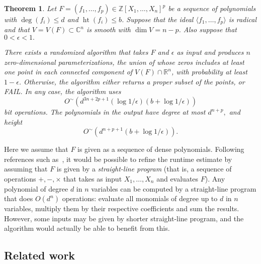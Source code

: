 \documentclass[a4paper]{article}
\DeclareMathOperator{\htt}{ht}
\newcommand{\ZZ}{{\mathbb{Z}}}
\def\C{\mathbb{C}}
\def\R{\mathbb{R}}
\newtheorem{theorem}{Theorem}[section]
\begin{document}
%
%
\begin{theorem}\label{theo:main}
  Let $F= (f_1,\hdots,f_p)\in\ZZ[X_1,\hdots,X_n]^p$ be a sequence of polynomials with $\deg(f_i) \leq d$ and $\htt(f_i) \leq b$. Suppose that the ideal $\langle f_1,\hdots, f_p \rangle $ is radical and that $V=V(F) \subset \C^n$ is 
  smooth with $\dim V = n-p$. Also suppose that $0 < \epsilon < 1.$

  There exists a randomized algorithm that takes $F$ and $\epsilon$ as input and produces $n$ zero-dimensional parameterizations, the union
  of whose zeros includes at least one point in each connected
  component of $V(F) \cap \R^n$, with probability at least
  $1-\epsilon$. Otherwise, the algorithm either returns a proper
  subset of the points, or FAIL.  In any case, the algorithm uses
  \[
O^{\sim}(d^{3n+2p+1}(\log1/\epsilon)(b + \log1/\epsilon))
  \]
  bit operations. The polynomials in
  the output have degree at most $d^{n+p},$ and height 
  \[
O^{\sim}(d^{n+p+1}(b + \log1/\epsilon)).
  \]
\end{theorem}
%
%
\noindent 
Here we assume that $F$ is given as a sequence of dense polynomials.  Following
references such
as~\cite{GiHeMoPa95,GiHaHeMoMoPa97,GiHeMoMoPa98,BaGiHeMb97,EMP}, it
would be possible to refine the runtime estimate by assuming that $F$
is given by a {\em straight-line program} (that is, a sequence of
operations $+,-,\times$ that takes as input $X_1,\dots,X_n$ and
evaluates $F$). Any polynomial of degree $d$ in $n$ variables can be computed by a straight-line program that does $O(d^n)$ operations: evaluate all monomials of degree up to $d$ in $n$ variables, multiply them by their respective coefficients and sum the results. However, some inputs may be given by shorter straight-line program, and the algorithm would actually be able to benefit from this. 






\subsection{Related work}






\end{document}
